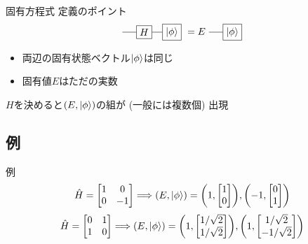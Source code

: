 \documentclass[dvipdfm]{beamer}
\begin{document}
\begin{frame}{固有方程式 定義のポイント}
    \begin{equation*}
        \vcenter{\hbox{
            \begin{tikzpicture}
                \node at(-1,0)[draw,rectangle](H){$H$};
                \node at(0,0)[draw,rectangle](psi){$\ket{\phi}$};
                \draw(H.east)--(psi.west)(H.west)--++(-.5,0);
            \end{tikzpicture}
        }}
        =
        E
        \vcenter{\hbox{
            \begin{tikzpicture}
                \node at(0,0)[draw,rectangle](psi){$\ket{\phi}$};
                \draw(psi.west)--++(-.5,0);
            \end{tikzpicture}
        }}
    \end{equation*}
    \begin{itemize}
        \item 両辺の固有状態ベクトル$\ket{\phi}$は同じ
        \item 固有値$E$はただの実数
    \end{itemize}
    $H$を決めると$(E, \ket{\phi})$の組が (一般には複数個) 出現
\end{frame}

\subsection{例}

\begin{frame}{例}
    \begin{equation*}
        \hat{H}
        =
        \mqty[
            1 & 0
            \\
            0 & -1
        ]
        \Longrightarrow
        (E,\ket{\phi})
        =
        \qty(1,\mqty[1\\0]),
        \qty(-1,\mqty[0\\1])
    \end{equation*}
    \begin{equation*}
        \hat{H}
        =
        \mqty[
            0 & 1
            \\
            1 & 0
        ]
        \Longrightarrow
        (E,\ket{\phi})
        =
        \qty(1,\mqty[1/\sqrt{2}\\1/\sqrt{2}]),
        \qty(1,\mqty[1/\sqrt{2}\\-1/\sqrt{2}])
    \end{equation*}
\end{frame}
\end{document}
